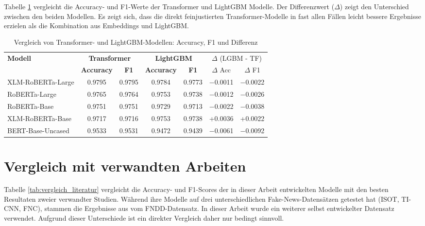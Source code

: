Tabelle \ref{tab:transformer_vs_lightgbm} vergleicht die Accuracy- und F1-Werte der Transformer und LightGBM Modelle.
Der Differenzwert ($\Delta$) zeigt den Unterschied zwischen den beiden Modellen.
Es zeigt sich, dass die direkt feinjustierten Transformer-Modelle in fast allen Fällen leicht bessere Ergebnisse erzielen als die Kombination aus 
Embeddings und LightGBM.

\begin{table}[!ht]
\centering
\begin{tabular}{lcccccc}
    \toprule
    \multirow{2}{*}{\textbf{Modell}} &
    \multicolumn{2}{c}{\textbf{Transformer}} &
    \multicolumn{2}{c}{\textbf{LightGBM}} &
    \multicolumn{2}{c}{$\Delta$ (LGBM - TF)} \\
    \cmidrule(lr){2-3} \cmidrule(lr){4-5} \cmidrule(l){6-7}
    & \textbf{Accuracy} & \textbf{F1} & \textbf{Accuracy} & \textbf{F1} & $\Delta$ Acc & $\Delta$ F1 \\
    \midrule
    XLM-RoBERTa-Large & 0.9795 & 0.9795 & 0.9784 & 0.9773 & $-$0.0011 & $-$0.0022 \\
    RoBERTa-Large     & 0.9765 & 0.9764 & 0.9753 & 0.9738 & $-$0.0012 & $-$0.0026 \\
    RoBERTa-Base      & 0.9751 & 0.9751 & 0.9729 & 0.9713 & $-$0.0022 & $-$0.0038 \\
    XLM-RoBERTa-Base  & 0.9717 & 0.9716 & 0.9753 & 0.9738 & +0.0036 & +0.0022 \\
    BERT-Base-Uncased & 0.9533 & 0.9531 & 0.9472 & 0.9439 & $-$0.0061 & $-$0.0092 \\
    \bottomrule
\end{tabular}
\caption{Vergleich von Transformer- und LightGBM-Modellen: Accuracy, F1 und Differenz}
\label{tab:transformer_vs_lightgbm}
\end{table}


\section{Vergleich mit verwandten Arbeiten}

Tabelle \ref{tab:vergleich_literatur} vergleicht die Accuracy- und F1-Scores der in dieser Arbeit entwickelten Modelle mit den besten Resultaten zweier 
verwandter Studien. Während \cite{Essa:2023aa} ihre Modelle auf drei unterschiedlichen Fake-News-Datensätzen getestet hat 
(ISOT, TI-CNN, FNC), stammen die Ergebnisse aus \cite{V_G_2024} vom FNDD-Datensatz. In dieser Arbeit wurde ein weiterer selbst entwickelter Datensatz verwendet. 
Aufgrund dieser Unterschiede ist ein direkter Vergleich daher nur bedingt sinnvoll.

